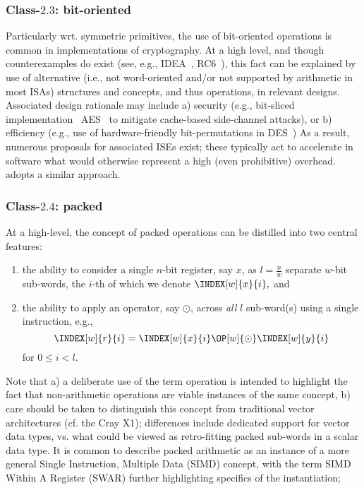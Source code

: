 \subsubsection{Class-$2.3$: bit-oriented}
\label{sec:bg:feature:2:3}

Particularly wrt. symmetric primitives, the use of bit-oriented operations 
is common in implementations of cryptography.  At a high level, and though 
counterexamples do exist 
(see, e.g., IDEA~\cite{SCARV:LaiMas:90}, RC6~\cite{SCARV:RRSY:98}),
this fact can be explained by use of alternative (i.e., not word-oriented
and/or not supported by arithmetic in most ISAs) structures and concepts,
and thus operations, in relevant designs.  Associated design rationale may
include
a) security
   (e.g., bit-sliced implementation~\cite{SCARV:KasSch:09} AES~\cite{SCARV:FIPS:197} to mitigate cache-based side-channel attacks),
   or
b) efficiency
   (e.g., use of hardware-friendly bit-permutations in DES~\cite{SCARV:FIPS:46_3})
As a result, numerous proposals for associated ISEs exist; these typically
act to accelerate in software what would otherwise represent a high (even 
prohibitive) overhead.  \XCID adopts a similar approach.


\subsubsection{Class-$2.4$: packed}
\label{sec:bg:feature:2:4}

At a high-level, the concept of packed operations can be distilled into two 
central features:

\begin{enumerate}
\item the ability to consider a single $n$-bit register, 
      say $x$, 
      as $l = \frac{n}{w}$ separate $w$-bit sub-words, the $i$-th of which
      we denote
      $
      \INDEX[w]{x}{i} ,
      $
      and
\item the ability to apply an operator,
      say $\odot$,
      across {\em all} $l$ sub-word(s) using a single instruction, e.g.,
      \[
      \INDEX[w]{r}{i} = \INDEX[w]{x}{i} \OP[w]{\odot} \INDEX[w]{y}{i}
      \]
      for $0 \leq i < l$.
\end{enumerate}

\noindent
Note that
a) a deliberate use of the term operation is intended to highlight the fact 
   that non-arithmetic operations are viable instances of the same concept,
b) care should be taken to distinguish this concept from traditional vector 
   architectures
   (cf. the Cray X1);
   differences include dedicated support for vector data types, vs. what
   could be viewed as retro-fitting packed sub-words in a scalar data type.
It is common to describe packed arithmetic as an instance of a more general
Single Instruction, Multiple Data (SIMD) concept, with the term SIMD Within 
A Register (SWAR) further highlighting specifics of the instantiation;

